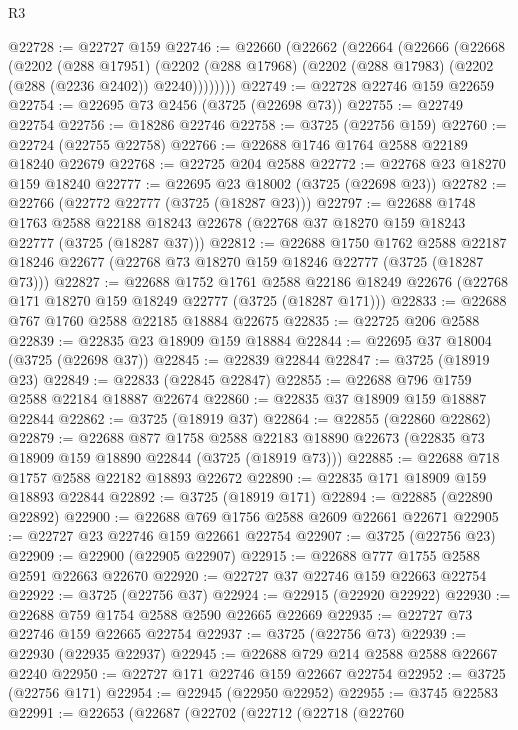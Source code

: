 \begin{lexlean}{R3}
\begin{coremodule}
@22728 := @22727 @159
@22746 := @22660
    (@22662
      (@22664
        (@22666
          (@22668
            (@2202
              (@288 @17951)
              (@2202 (@288 @17968) (@2202 (@288 @17983) (@2202 (@288 (@2236 @2402)) @2240))))))))
@22749 := @22728 @22746 @159 @22659
@22754 := @22695 @73 @2456 (@3725 (@22698 @73))
@22755 := @22749 @22754
@22756 := @18286 @22746
@22758 := @3725 (@22756 @159)
@22760 := @22724 (@22755 @22758)
@22766 := @22688 @1746 @1764 @2588 @22189 @18240 @22679
@22768 := @22725 @204 @2588
@22772 := @22768 @23 @18270 @159 @18240
@22777 := @22695 @23 @18002 (@3725 (@22698 @23))
@22782 := @22766 (@22772 @22777 (@3725 (@18287 @23)))
@22797 := @22688
    @1748
    @1763
    @2588
    @22188
    @18243
    @22678
    (@22768 @37 @18270 @159 @18243 @22777 (@3725 (@18287 @37)))
@22812 := @22688
    @1750
    @1762
    @2588
    @22187
    @18246
    @22677
    (@22768 @73 @18270 @159 @18246 @22777 (@3725 (@18287 @73)))
@22827 := @22688
    @1752
    @1761
    @2588
    @22186
    @18249
    @22676
    (@22768 @171 @18270 @159 @18249 @22777 (@3725 (@18287 @171)))
@22833 := @22688 @767 @1760 @2588 @22185 @18884 @22675
@22835 := @22725 @206 @2588
@22839 := @22835 @23 @18909 @159 @18884
@22844 := @22695 @37 @18004 (@3725 (@22698 @37))
@22845 := @22839 @22844
@22847 := @3725 (@18919 @23)
@22849 := @22833 (@22845 @22847)
@22855 := @22688 @796 @1759 @2588 @22184 @18887 @22674
@22860 := @22835 @37 @18909 @159 @18887 @22844
@22862 := @3725 (@18919 @37)
@22864 := @22855 (@22860 @22862)
@22879 := @22688
    @877
    @1758
    @2588
    @22183
    @18890
    @22673
    (@22835 @73 @18909 @159 @18890 @22844 (@3725 (@18919 @73)))
@22885 := @22688 @718 @1757 @2588 @22182 @18893 @22672
@22890 := @22835 @171 @18909 @159 @18893 @22844
@22892 := @3725 (@18919 @171)
@22894 := @22885 (@22890 @22892)
@22900 := @22688 @769 @1756 @2588 @2609 @22661 @22671
@22905 := @22727 @23 @22746 @159 @22661 @22754
@22907 := @3725 (@22756 @23)
@22909 := @22900 (@22905 @22907)
@22915 := @22688 @777 @1755 @2588 @2591 @22663 @22670
@22920 := @22727 @37 @22746 @159 @22663 @22754
@22922 := @3725 (@22756 @37)
@22924 := @22915 (@22920 @22922)
@22930 := @22688 @759 @1754 @2588 @2590 @22665 @22669
@22935 := @22727 @73 @22746 @159 @22665 @22754
@22937 := @3725 (@22756 @73)
@22939 := @22930 (@22935 @22937)
@22945 := @22688 @729 @214 @2588 @2588 @22667 @2240
@22950 := @22727 @171 @22746 @159 @22667 @22754
@22952 := @3725 (@22756 @171)
@22954 := @22945 (@22950 @22952)
@22955 := @3745 @22583
@22991 := @22653
    (@22687
      (@22702
        (@22712
          (@22718
            (@22760

\end{coremodule}
\end{lexlean}
